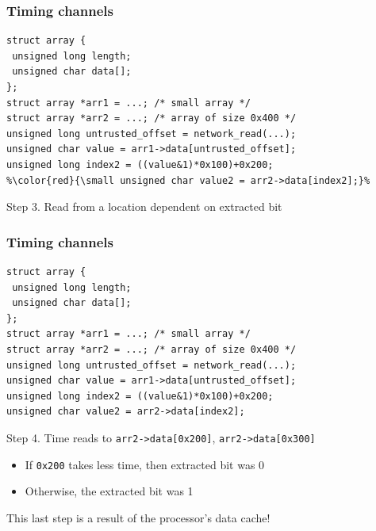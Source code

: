 \documentclass[10pt]{beamer}
\begin{document}
\begin{frame}[fragile]

\frametitle{Timing channels}

\begin{lstlisting}[basicstyle=\small,style=customjava]
struct array {
 unsigned long length;
 unsigned char data[];
};
struct array *arr1 = ...; /* small array */
struct array *arr2 = ...; /* array of size 0x400 */
unsigned long untrusted_offset = network_read(...);
unsigned char value = arr1->data[untrusted_offset];
unsigned long index2 = ((value&1)*0x100)+0x200;
%\color{red}{\small unsigned char value2 = arr2->data[index2];}%
\end{lstlisting}

\begin{center}
Step 3. Read from a location dependent on extracted bit
\end{center}

\end{frame}


\begin{frame}[fragile]

\frametitle{Timing channels}

\begin{lstlisting}[basicstyle=\small,style=customjava]
struct array {
 unsigned long length;
 unsigned char data[];
};
struct array *arr1 = ...; /* small array */
struct array *arr2 = ...; /* array of size 0x400 */
unsigned long untrusted_offset = network_read(...);
unsigned char value = arr1->data[untrusted_offset];
unsigned long index2 = ((value&1)*0x100)+0x200;
unsigned char value2 = arr2->data[index2];
\end{lstlisting}

\begin{center}
Step 4. Time reads to \texttt{arr2->data[0x200]}, \texttt{arr2->data[0x300]}
\pause
\begin{itemize}
\item If \texttt{0x200} takes less time, then extracted bit was 0
\item Otherwise, the extracted bit was 1 \\[1em]
\end{itemize}
\pause
This last step is a result of the processor's data cache!
\end{center}

\end{frame}

\end{document}
